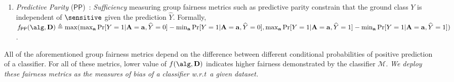 \begin{enumerate}[leftmargin=*]
	
	\item \textit{Predictive Parity} ($ \mathsf{PP} $)~\cite{verma2018fairness}: \textit{Sufficiency} measuring group fairness metrics such as predictive parity constrain that the ground class $ Y $ is independent of $ \sensitive $ given the prediction $ \widehat{Y} $. Formally, $ f_{\mathsf{PP}}(\alg, \mathbf{D})  \triangleq \max(\max_{\mathbf{a}}\Pr[Y =1 | \mathbf{A} = \mathbf{a}, \widehat{Y} = 0] - \min_{\mathbf{a}}\Pr[Y =1 | \mathbf{A} = \mathbf{a}, \widehat{Y} = 0], \max_{\mathbf{a}}\Pr[Y =1 | \mathbf{A} = \mathbf{a}, \widehat{Y} = 1] - \min_{\mathbf{a}}\Pr[Y =1 | \mathbf{A} = \mathbf{a}, \widehat{Y} = 1])$. %
\end{enumerate}
All of the aforementioned group fairness metrics depend on the difference between different conditional probabilities of positive prediction of a classifier.
For all of these metrics, lower value of $ f(\alg, \mathbf{D}) $ indicates higher fairness demonstrated by the classifier $\mathcal{M}$. \textit{We deploy these fairness metrics as the measures of bias of a classifier w.r.t\ a given dataset.}%

